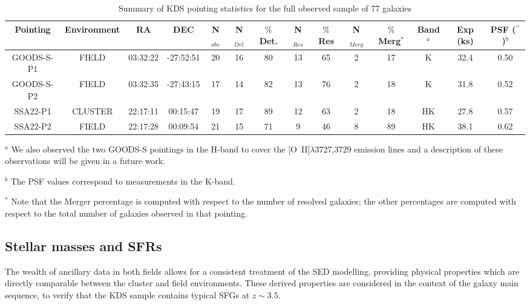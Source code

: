 \documentclass[fleqn,usenatbib]{mn2e}
\begin{document}
\begin{table*}
\centering
\begin{threeparttable}
\caption{Summary of KDS pointing statistics for the full observed sample of 77 galaxies}
\label{tab:pointings}
\begin{tabular}{c c c c c c c c c c c c c c}

 \hline
Pointing & Environment & RA & DEC & N$_{obs}$ & N$_{Det}$ & $\%$ Det. & N$_{Res}$ & $\%$ Res & N$_{Merg}$ & $\%$ Merg$^{*}$ & Band$^{a}$ & Exp (ks) & PSF ($^{\prime\prime}$)$^{b}$  \\
 \hline
 GOODS-S-P1 & FIELD & 03:32:22 & -27:52:51 & 20 & 16 & 80 & 13 & 65 & 2 & 17 & K & 32.4 & 0.50 \\
GOODS-S-P2 & FIELD & 03:32:35 & -27:43:15 & 17 & 14 & 82 & 13 & 76 & 2 & 18 & K & 31.8 & 0.52 \\
SSA22-P1 & CLUSTER & 22:17:11 & 00:15:47 & 19 & 17 & 89 & 12 & 63 & 2 & 18 & HK & 27.8 & 0.57 \\
SSA22-P2 & FIELD & 22:17:28 & 00:09:54 & 21 & 15 & 71 & 9 & 46 & 8 & 89 & HK & 38.1 & 0.62 \\
 \hline
\end{tabular}
\begin{tablenotes}
      \small
      \item $^{a}$ We also observed the two GOODS-S pointings in the H-band to cover the [O~{\sc II}]$\lambda$3727,3729 emission lines and a description of these observations will be given in a future work.
      \item $^{b}$ The PSF values correspond to measurements in the K-band.
      \item $^{*}$ Note that the Merger percentage is computed with respect to the number of resolved galaxies; the other percentages are computed with respect to the total number of galaxies observed in that pointing.
    \end{tablenotes}
  \end{threeparttable}
  \end{table*}

\subsection{Stellar masses and SFRs}\label{subsec:stellar_masses_and_sfrs}
The wealth of ancillary data in both fields allows for a consistent treatment of the SED modelling, providing physical properties which are directly comparable between the cluster and field environments.
These derived properties are considered in the context of the galaxy main sequence, to verify that the KDS sample contains typical SFGs at $z\sim3.5$.   
\end{document}
